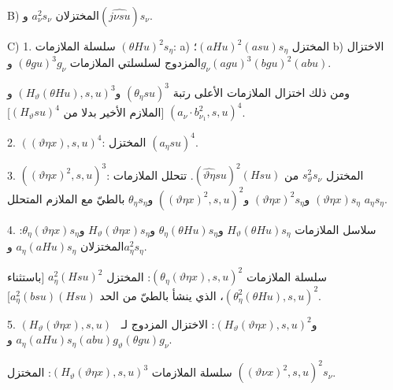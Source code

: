 \documentclass[11pt]{article}
\begin{document}
B) المختزلان $a_\nu^2s_\nu$ و$(\widehat{j\nu su})s_\nu$.

C) 1. سلسلة الملازمات $(\theta Hu)^2s_\eta$: a) المختزل $(aHu)^2(asu)s_\eta$؛ b) الاختزال المزدوج لسلسلتي الملازمات $(\theta gu)^3g_\nu$ و$g_\nu(agu)^3(bgu)^2(abu)$.

ومن ذلك اختزال الملازمات الأعلى رتبة $(\theta_\eta su)^3$ و$(H_\vartheta(\theta Hu),s,u)^3$ و$(a_\nu\cdot b_{\nu_1}^2,s,u)^4$ [الملازم الأخير بدلا من $(H_\vartheta su)^4$].

2. $((\vartheta\eta x),s,u)^4$: المختزل $(a_\eta su)^4$.

3. $((\vartheta\eta x)^2,s,u)^3$: المختزل $s_\vartheta^2s_\nu$ من $(\widehat{\vartheta\eta}su)^2(Hsu)$.
تتحلل الملازمات $(\vartheta\eta x)s_\eta$ و$(\vartheta\eta x)^2s_\eta$ و$((\vartheta\eta x)^2,s,u)^2$ و$\theta_\eta s_\eta$ بالطيّ مع الملازم المتحلل $a_\eta s_\eta$.

4. سلاسل الملازمات $H_\vartheta(\theta Hu)s_\eta$ و$\theta_\eta(\theta Hu)s_\eta$ و$H_\vartheta(\vartheta\eta x)s_\eta$ و$\theta_\eta(\vartheta\eta x)s_\eta$:
المختزلان $a_\eta(aHu)s_\eta$ و$a_\eta^2s_\eta$.

سلسلة الملازمات $(\theta_\eta(\vartheta\eta x),s,u)^2$: المختزل $a_\eta^2(Hsu)^2$ [باستثناء $(\theta_\eta^2(\theta Hu),s,u)^2$، الذي ينشأ بالطيّ من الحد $a_\eta^2(bsu)(Hsu)$].

5. $(H_\vartheta(\vartheta\eta x),s,u)$ و$(H_\vartheta(\vartheta\eta x),s,u)^2$: الاختزال المزدوج لـ~$a_\eta(aHu)s_\eta(abu)$ و$g_\vartheta(\theta gu)g_\nu$.

سلسلة الملازمات $(H_\vartheta(\vartheta\eta x),s,u)^3$: المختزل $((\vartheta \nu x)^2,s,u)^2s_\nu$.
\end{document}
